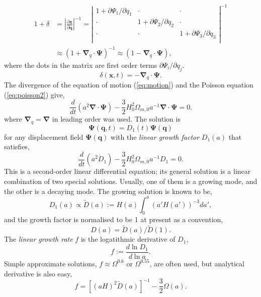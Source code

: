 \documentclass[a4paper]{article}
\begin{document}
\begin{align}
  1 + \delta
    &= \left| \frac{\partial \bm{x}}{\partial \bm{q}} \right|^{-1}
     = \left|
         \begin{array}{ccc}
           1 + \partial \Psi_1/\partial q_1 & \cdot & \cdot  \\
           \cdot &  1 + \partial \Psi_2/\partial q_2 & \cdot \\
          \cdot &  \cdot & 1 + \partial \Psi_3/\partial q_3 \\
         \end{array}
       \right|^{-1}\\
       &\approx (1 + \bm{\nabla}_q \cdot \bm{\Psi})^{-1}
       \approx (1 - \bm{\nabla}_q \cdot \bm{\Psi}),
\end{align}
where the dots in the matrix are first order terms $\partial
\Psi_i/\partial q_j$.
\begin{equation}
  \delta(\bm{x}, t) = - \bm{\nabla}_q \cdot \bm{\Psi}.
\end{equation}
The divergence of the equation of motion (\ref{eq:motion}) and the
Poisson equation (\ref{eq:poisson2}) give,
\begin{equation}
  \frac{d}{dt} \left( a^2 \bm{\nabla}\cdot\bm{\Psi} \right)
  - \frac{3}{2} H_0^2 \Omega_{m,0} a^{-1} \bm{\nabla}\cdot\bm{\Psi} = 0.
\end{equation}
where $\bm{\nabla}_q = \bm{\nabla}$ in leading order was used.
The solution is
\begin{equation}
  \bm{\Psi}(\bm{q}, t) = D_1(t) \bm{\Psi}(\bm{q})
\end{equation}
for any displacement field $\bm{\Psi}(\bm{q})$ with the \textit{linear growth factor} $D_1(a)$ that satisfies,
\begin{equation}
  \label{eq:linear-growth-factor}
  \frac{d}{dt}\left( a^2 \dot{D}_1 \right)
  - \frac{3}{2} H_0^2 \Omega_{m,0} a^{-1} D_1 = 0.
\end{equation}
This is a second-order linear differential equation; its general
solution is a linear combination of two special solutions. Usually,
one of them is a growing mode, and the other is a decaying mode. The
growing solution is known to be,
\begin{equation}
  D_1(a) \propto \tilde{D}(a) := H(a) \int_0^a \left( a'H(a') \right)^{-3} da',
\end{equation}
and the growth factor is normalised to be 1 at present as a convention,
\begin{equation}
  D(a) = \tilde{D}(a)/\tilde{D}(1).
\end{equation}
%
The \textit{linear growth rate} $f$ is the logatithmic derivative of $D_1$,
\begin{equation}
  f := \frac{d\ln D_1}{d\ln a}.
\end{equation}
Simple approximate solutions, $f \approx \Omega^{0.6}$ or
$\Omega^{0.55}$, are often used, but analytical derivative is also easy,
\begin{equation}
  f = \left[ (aH)^2 \tilde{D}(a) \right]^{-1} - \frac{3}{2} \Omega(a).
\end{equation}
\end{document}
